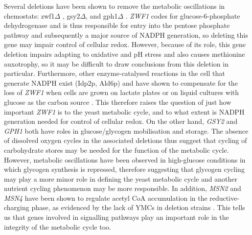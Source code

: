 Several deletions have been shown to remove the metabolic oscillations in chemostats: zwf1$\Delta$ \citep{tuCyclicChangesMetabolic2007}, gsy2$\Delta$, and gph1$\Delta$ \parencite{oneillEukaryoticCellBiology2020}.
\emph{ZWF1} codes for glucose-6-phosphate dehydrogenase and is thus responsible for entry into the pentose phosphate pathway and subsequently a major source of NADPH generation, so deleting this gene may impair control of cellular redox.
However, because of its role, this gene deletion impairs adapting to oxidative and pH stress and also causes methionine auxotrophy, so it may be difficult to draw conclusions from this deletion in particular.
Furthermore, other enzyme-catalysed reactions in the cell that generate NADPH exist (Idp2p, Ald6p) and have shown to compensate for the loss of \emph{ZWF1} when cells are grown on lactate plates or on liquid cultures with glucose as the carbon source \parencite{minardSourcesNADPHYeast2005}.
This therefore raises the question of just how important \emph{ZWF1} is to the yeast metabolic cycle, and to what extent is NADPH generation needed for control of cellular redox.
On the other hand, \emph{GSY2} and \emph{GPH1} both have roles in glucose/glycogen mobilisation and storage.
The absence of dissolved oxygen cycles in the associated deletions thus suggest that cycling of carbohydrate stores may be needed for the function of the metabolic cycle.
However, metabolic oscillations have been observed in high-glucose conditions \parencite{papagiannakisAutonomousMetabolicOscillations2017, baumgartnerFlavinbasedMetabolicCycles2018} in which glycogen synthesis is repressed, therefore suggesting that glycogen cycling may play a more minor role in defining the yeast metabolic cycle and another nutrient cycling phenomenon may be more responsible.
In addition, \emph{MSN2} and \emph{MSN4} have been shown to regulate acetyl CoA accumulation in the reductive-charging phase, as evidenced by the lack of YMCs in deletion strains \citep{kuangMsn2RegulateExpression2017}.
This tells us that genes involved in signalling pathways play an important role in the integrity of the metabolic cycle too.

